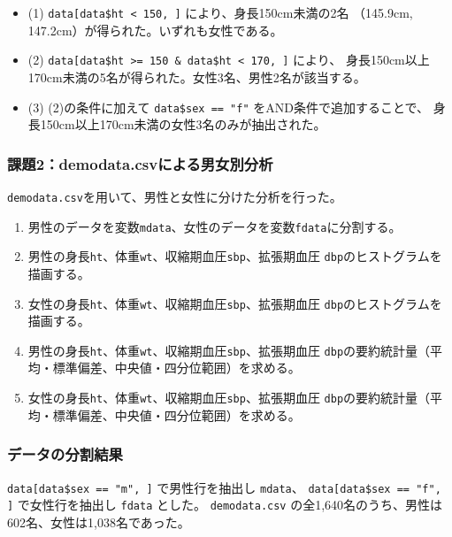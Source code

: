 \documentclass[12pt,a4paper]{ltjsarticle}
\begin{document}
\begin{itemize}[nosep]
    \item (1) \texttt{data[data\$ht < 150, ]} により、身長150cm未満の2名
          （145.9cm, 147.2cm）が得られた。いずれも女性である。
    \item (2) \texttt{data[data\$ht >= 150 \& data\$ht < 170, ]} により、
          身長150cm以上170cm未満の5名が得られた。女性3名、男性2名が該当する。
    \item (3) (2)の条件に加えて \texttt{data\$sex == "f"} をAND条件で追加することで、
          身長150cm以上170cm未満の女性3名のみが抽出された。
\end{itemize}

\subsubsection{課題2：demodata.csvによる男女別分析}\label{sec:table-task2}

\texttt{demodata.csv}を用いて、男性と女性に分けた分析を行った。

\begin{enumerate}[nosep, label=(\arabic*)]
    \item 男性のデータを変数\texttt{mdata}、女性のデータを変数\texttt{fdata}に分割する。
    \item 男性の身長\texttt{ht}、体重\texttt{wt}、収縮期血圧\texttt{sbp}、拡張期血圧
          \texttt{dbp}のヒストグラムを描画する。
    \item 女性の身長\texttt{ht}、体重\texttt{wt}、収縮期血圧\texttt{sbp}、拡張期血圧
          \texttt{dbp}のヒストグラムを描画する。
    \item 男性の身長\texttt{ht}、体重\texttt{wt}、収縮期血圧\texttt{sbp}、拡張期血圧
          \texttt{dbp}の要約統計量（平均・標準偏差、中央値・四分位範囲）を求める。
    \item 女性の身長\texttt{ht}、体重\texttt{wt}、収縮期血圧\texttt{sbp}、拡張期血圧
          \texttt{dbp}の要約統計量（平均・標準偏差、中央値・四分位範囲）を求める。
\end{enumerate}



\subsubsection*{データの分割結果}
\texttt{data[data\$sex == "m", ]} で男性行を抽出し \texttt{mdata}、
\texttt{data[data\$sex == "f", ]} で女性行を抽出し \texttt{fdata} とした。
\texttt{demodata.csv} の全1,640名のうち、男性は602名、女性は1,038名であった。
\end{document}
